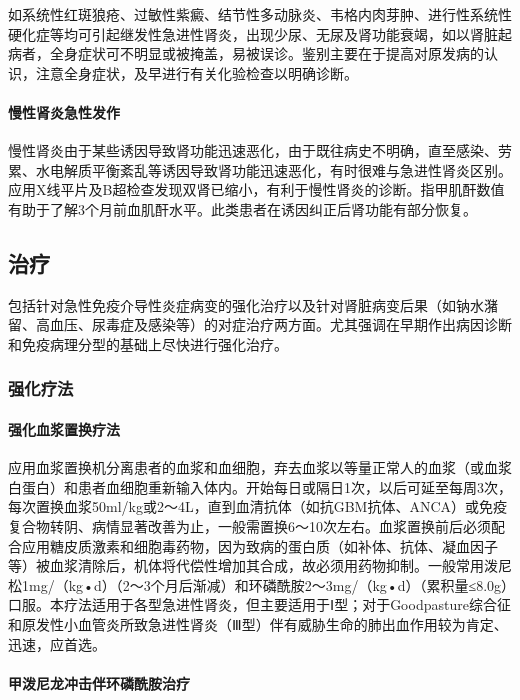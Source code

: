 如系统性红斑狼疮、过敏性紫癜、结节性多动脉炎、韦格内肉芽肿、进行性系统性硬化症等均可引起继发性急进性肾炎，出现少尿、无尿及肾功能衰竭，如以肾脏起病者，全身症状可不明显或被掩盖，易被误诊。鉴别主要在于提高对原发病的认识，注意全身症状，及早进行有关化验检查以明确诊断。

\paragraph{慢性肾炎急性发作}

慢性肾炎由于某些诱因导致肾功能迅速恶化，由于既往病史不明确，直至感染、劳累、水电解质平衡紊乱等诱因导致肾功能迅速恶化，有时很难与急进性肾炎区别。应用X线平片及B超检查发现双肾已缩小，有利于慢性肾炎的诊断。指甲肌酐数值有助于了解3个月前血肌酐水平。此类患者在诱因纠正后肾功能有部分恢复。

\subsection{治疗}

包括针对急性免疫介导性炎症病变的强化治疗以及针对肾脏病变后果（如钠水潴留、高血压、尿毒症及感染等）的对症治疗两方面。尤其强调在早期作出病因诊断和免疫病理分型的基础上尽快进行强化治疗。

\subsubsection{强化疗法}

\paragraph{强化血浆置换疗法}

应用血浆置换机分离患者的血浆和血细胞，弃去血浆以等量正常人的血浆（或血浆白蛋白）和患者血细胞重新输入体内。开始每日或隔日1次，以后可延至每周3次，每次置换血浆50ml/kg或2～4L，直到血清抗体（如抗GBM抗体、ANCA）或免疫复合物转阴、病情显著改善为止，一般需置换6～10次左右。血浆置换前后必须配合应用糖皮质激素和细胞毒药物，因为致病的蛋白质（如补体、抗体、凝血因子等）被血浆清除后，机体将代偿性增加其合成，故必须用药物抑制。一般常用泼尼松1mg/（kg•d）（2～3个月后渐减）和环磷酰胺2～3mg/（kg•d）（累积量≤8.0g）口服。本疗法适用于各型急进性肾炎，但主要适用于Ⅰ型；对于Goodpasture综合征和原发性小血管炎所致急进性肾炎（Ⅲ型）伴有威胁生命的肺出血作用较为肯定、迅速，应首选。

\paragraph{甲泼尼龙冲击伴环磷酰胺治疗}

